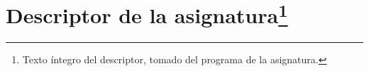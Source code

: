 \section[Descriptor de la asignatura]{Descriptor de la asignatura\footnote{Texto íntegro del descriptor, tomado del programa de la asignatura.}}

\lipsum[1-4] %
\pagebreak